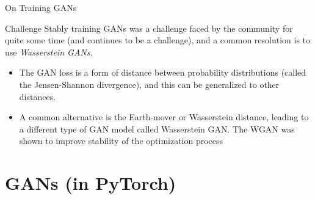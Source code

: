 \documentclass[aspectratio=169,xcolor=dvipsnames,svgnames,x11names,fleqn]{beamer}
\begin{document}
\begin{frame}{On Training GANs}

    \small

\begin{tblock}{Challenge}
Stably training GANs was a challenge faced by the community for quite some time (and continues to be a challenge), and a common resolution is to use {\em Wasserstein GANs. }
\begin{itemize}
    \item The GAN loss is a form of distance between probability distributions (called the Jensen-Shannon divergence), and this can be generalized to other distances. 
    \item A common alternative is the Earth-mover or Wasserstein distance, leading to a different type of GAN model called Wasserstein GAN. The WGAN was shown to improve stability of the optimization process
\end{itemize}
\end{tblock}


\end{frame}



\section{GANs (in PyTorch)}

\begin{frame}
    \sectionpage
\end{frame}
\end{document}
